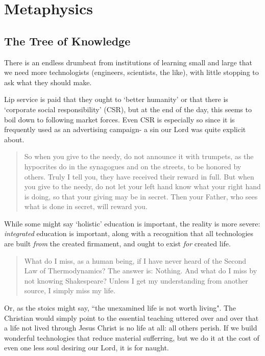 \documentclass[letterpaper]{article}
\begin{document}
\section{Metaphysics}

\subsection{The Tree of Knowledge}

There is an endless drumbeat from institutions of learning small and large that we need more technologists (engineers, scientists, the like), with little stopping to ask what they should make.

Lip service is paid that they ought to `better humanity' or that there is `corporate social responsibility' (CSR), but at the end of the day, this seems to boil down to following market forces. Even CSR is especially so since it is frequently used as an advertising campaign- a sin our Lord was quite explicit about.

\begin{quote}
  So when you give to the needy, do not announce it with trumpets, as the hypocrites do in the synagogues and on the streets, to be honored by others. Truly I tell you, they have received their reward in full. But when you give to the needy, do not let your left hand know what your right hand is doing, so that your giving may be in secret. Then your Father, who sees what is done in secret, will reward you.
\end{quote}

While some might say `holistic' education is important, the reality is more severe: \textit{integrated} education is important, along with a recognition that all technologies are built \textit{from} the created firmament, and ought to exist \textit{for} created life.

\begin{quote}
What do I miss, as a human being, if I have never heard of the Second Law of Thermodynamics? The answer is: Nothing. And what do I miss by not knowing Shakespeare? Unless I get my understanding from another source, I simply miss my life.
\end{quote}

Or, as the stoics might say, ``the unexamined life is not worth living". The Christian would simply point to the essential teaching uttered over and over that a life not lived through Jesus Christ is no life at all: all others perish. If we build wonderful technologies that reduce material sufferring, but we do it at the cost of even one less soul desiring our Lord, it is for naught.
\end{document}
